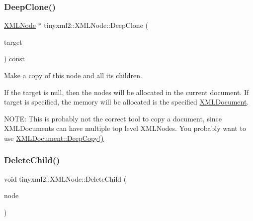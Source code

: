 \mbox{\label{classtinyxml2_1_1_x_m_l_node_a3bb369fd733f1989b751d99a9417adab}} 
\subsubsection{\texorpdfstring{Deep\+Clone()}{DeepClone()}}
{\footnotesize\ttfamily \mbox{\hyperlink{classtinyxml2_1_1_x_m_l_node}{X\+M\+L\+Node}} $\ast$ tinyxml2\+::\+X\+M\+L\+Node\+::\+Deep\+Clone (\begin{DoxyParamCaption}\item[{\mbox{\hyperlink{classtinyxml2_1_1_x_m_l_document}{X\+M\+L\+Document}} $\ast$}]{target }\end{DoxyParamCaption}) const}

Make a copy of this node and all its children.

If the \textquotesingle{}target\textquotesingle{} is null, then the nodes will be allocated in the current document. If \textquotesingle{}target\textquotesingle{} is specified, the memory will be allocated is the specified \mbox{\hyperlink{classtinyxml2_1_1_x_m_l_document}{X\+M\+L\+Document}}.

N\+O\+TE\+: This is probably not the correct tool to copy a document, since X\+M\+L\+Documents can have multiple top level X\+M\+L\+Nodes. You probably want to use \mbox{\hyperlink{classtinyxml2_1_1_x_m_l_document_af592ffc91514e25a39664521ac83db45}{X\+M\+L\+Document\+::\+Deep\+Copy()}} \mbox{\label{classtinyxml2_1_1_x_m_l_node_a363b6edbd6ebd55f8387d2b89f2b0921}} 
\subsubsection{\texorpdfstring{Delete\+Child()}{DeleteChild()}}
{\footnotesize\ttfamily void tinyxml2\+::\+X\+M\+L\+Node\+::\+Delete\+Child (\begin{DoxyParamCaption}\item[{\mbox{\hyperlink{classtinyxml2_1_1_x_m_l_node}{X\+M\+L\+Node}} $\ast$}]{node }\end{DoxyParamCaption})}

